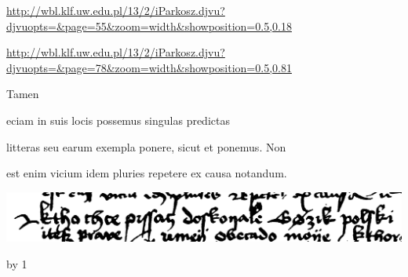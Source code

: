 
\newParkoszpage

{
\url{http://wbl.klf.uw.edu.pl/13/2/iParkosz.djvu?djvuopts=&page=55&zoom=width&showposition=0.5,0.18}

\url{http://wbl.klf.uw.edu.pl/13/2/iParkosz.djvu?djvuopts=&page=78&zoom=width&showposition=0.5,0.81}
}

\bigskip

\obeylines
\mono



\fullpreviouslines


{
\color{blue}

Tamen 

eciam in suis locis possemus singulas predictas 
}


\fulllines

litteras seu earum exempla ponere, sicut et ponemus. Non

est enim vicium idem pluries repetere ex causa notandum.



\def\splitverse{\advance\plineno by 1\psublineno=0\everypar{\advance\psublineno by 1\llap{\textcolor{green}{\the\ppageno-\ifnum\plineno<10 0\fi\the \plineno-\the\psublineno \ }}\hskip5em}}

\def\fullverselines{\everypar{\advance\plineno by 1\llap{\the\ppageno-\ifnum\plineno<10 0\fi\the \plineno \hskip 1.5em}\hskip5em}}


\def\newverse{\advance\plineno by 1\psublineno=0\hskip10em}
\def\newversesubline{\hskip10em}
\def\newverseline{\advance\plineno by 1\psublineno=0}
\def\indentVerse{\hskip10em}



\includegraphics[width=\hsize]{wierszP1m}

\splitverse


